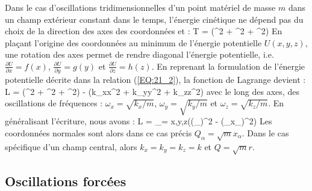 Dans le cas d'oscillations tridimensionnelles d'un point mat\'eriel de masse $m$ dans un champ ext\'erieur constant dans le temps, l'\'energie cin\'etique ne d\'epend pas du choix de la direction des axes des coordonn\'ees et :
\benn
	T = (^{2} + ^{2} + ^{2})
\eenn
En pla\c{c}ant l'origine des coordonn\'ees au minimum de l'\'energie potentielle $U(x,y,z)$, une rotation des axes permet de rendre diagonal l'\'energie potentielle, i.e. $\frac{\partial U}{\partial x} = f(x)$, $\frac{\partial U}{\partial y} = g(y)$ et $\frac{\partial U}{\partial z} = h(z)$. En reprenant la formulation de l'\'energie potentielle d\'ecrite dans la relation (\ref{EQ:21_2}), la fonction de Lagrange devient :
\be
	L = (^{2} + ^{2} + ^{2}) - (k_{x}x^{2} + k_{y}y^{2} + k_{z}z^{2}) \label{EQ:23_14}
\ee
avec le long des axes, des oscillations de fr\'equences : $\omega_{x} = \sqrt{k_{x}/m}$, $\omega_{y} = \sqrt{k_{y}/m}$ et $\omega_{z} = \sqrt{k_{z}/m}$. En g\'en\'eralisant l'\'ecriture, nous avons :
\benn
	L = \sum_{\alpha = x,y,z}\left((_{\alpha})^{2} - (\omega_{\alpha}x_{\alpha})^{2}\right)
\eenn
Les coordonn\'ees normales sont alors dans ce cas pr\'ecis $Q_{\alpha} = \sqrt{m}x_{\alpha}$. Dans le cas sp\'ecifique d'un champ central, alors $k_{x} = k_{y} = k_{z} = k$ et $Q = \sqrt{m}r$.

\subsection{Oscillations forc\'ees}

